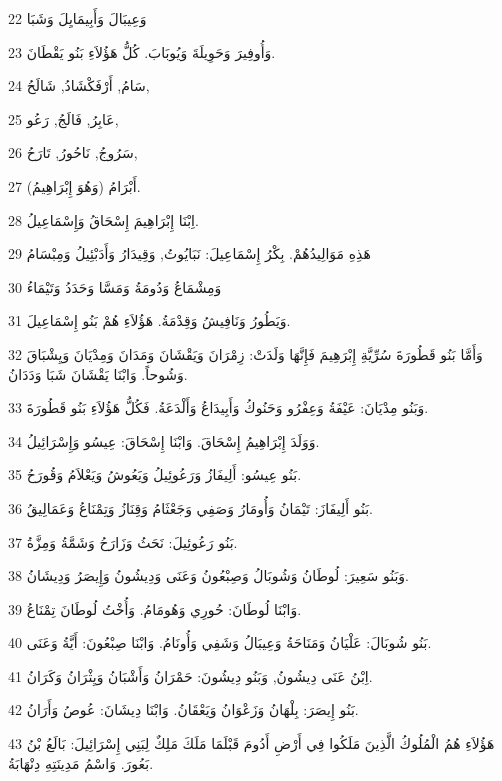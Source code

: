\par 22 وَعِيبَالَ وَأَبِيمَايِلَ وَشَبَا
\par 23 وَأُوفِيرَ وَحَوِيلَةَ وَيُوبَابَ. كُلُّ هَؤُلاَءِ بَنُو يَقْطَانَ.
\par 24 سَامُ, أَرْفَكْشَادُ, شَالَحُ,
\par 25 عَابِرُ, فَالَجُ, رَعُو,
\par 26 سَرُوجُ, نَاحُورُ, تَارَحُ,
\par 27 أَبْرَامُ (وَهُوَ إِبْرَاهِيمُ).
\par 28 اِبْنَا إِبْرَاهِيمَ إِسْحَاقُ وَإِسْمَاعِيلُ.
\par 29 هَذِهِ مَوَالِيدُهُمْ. بِكْرُ إِسْمَاعِيلَ: نَبَايُوتُ, وَقِيدَارُ وَأَدَبْئِيلُ وَمِبْسَامُ
\par 30 وَمِشْمَاعُ وَدُومَةُ وَمَسَّا وَحَدَدُ وَتَيْمَاءُ
\par 31 وَيَطُورُ وَنَافِيشُ وَقِدْمَةُ. هَؤُلاَءِ هُمْ بَنُو إِسْمَاعِيلَ.
\par 32 وَأَمَّا بَنُو قَطُورَةَ سُرِّيَّةِ إِبْرَهِيمَ فَإِنَّهَا وَلَدَتْ: زِمْرَانَ وَيَقْشَانَ وَمَدَانَ وَمِدْيَانَ وَيِشْبَاقَ وَشُوحاً. وَابْنَا يَقْشَانَ شَبَا وَدَدَانُ.
\par 33 وَبَنُو مِدْيَانَ: عَيْفَةُ وَعِفْرُو وَحَنُوكُ وَأَبِيدَاعُ وَأَلْدَعَةُ. فَكُلُّ هَؤُلاَءِ بَنُو قَطُورَةَ.
\par 34 وَوَلَدَ إِبْرَاهِيمُ إِسْحَاقَ. وَابْنَا إِسْحَاقَ: عِيسُو وَإِسْرَائِيلُ.
\par 35 بَنُو عِيسُو: أَلِيفَازُ وَرَعُوئِيلُ وَيَعُوشُ وَيَعْلاَمُ وَقُورَحُ.
\par 36 بَنُو أَلِيفَازَ: تَيْمَانُ وَأُومَارُ وَصَفِي وَجَعْثَامُ وَقِنَازُ وَتِمْنَاعُ وَعَمَالِيقُ.
\par 37 بَنُو رَعُوئِيلَ: نَحَثُ وَزَارَحُ وَشَمَّةُ وَمِزَّةُ.
\par 38 وَبَنُو سَعِيرَ: لُوطَانُ وَشُوبَالُ وَصِبْعُونُ وَعَنَى وَدِيشُونُ وَإِيصَرُ وَدِيشَانُ.
\par 39 وَابْنَا لُوطَانَ: حُورِي وَهُومَامُ. وَأُخْتُ لُوطَانَ تِمْنَاعُ.
\par 40 بَنُو شُوبَالَ: عَلْيَانُ وَمَنَاحَةُ وَعِيبَالُ وَشَفِي وَأُونَامُ. وَابْنَا صِبْعُونَ: أَيَّةُ وَعَنَى.
\par 41 اِبْنُ عَنَى دِيشُونُ, وَبَنُو دِيشُونَ: حَمْرَانُ وَأَشْبَانُ وَيِثْرَانُ وَكَرَانُ.
\par 42 بَنُو إِيصَرَ: بِلْهَانُ وَزَعْوَانُ وَيَعْقَانُ. وَابْنَا دِيشَانَ: عُوصُ وَأَرَانُ.
\par 43 هَؤُلاَءِ هُمُ الْمُلُوكُ الَّذِينَ مَلَكُوا فِي أَرْضِ أَدُومَ قَبْلَمَا مَلَكَ مَلِكٌ لِبَنِي إِسْرَائِيلَ: بَالَعُ بْنُ بَعُورَ. وَاسْمُ مَدِينَتِهِ دِنْهَابَةُ.
